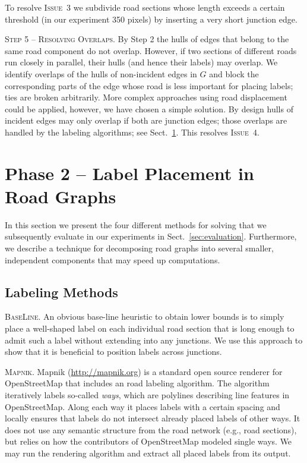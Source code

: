 \documentclass[a4paper,11pt]{article}
\newcommand{\myparagraph}[1]{\vspace*{.8ex}\noindent #1}
\newcommand{\ILong}{\textsc{Issue~3}\xspace}
\newcommand{\IFatLabels}{\textsc{Issue~4}\xspace}
\newcommand{\GreedyAlgo}{\textsc{Base\-Line}\xspace}
\begin{document}
 
 
 
To resolve \ILong we
 subdivide road sections whose length exceeds a certain threshold (in
 our experiment 350 pixels) by inserting a very short junction edge.


\textsc{Step 5 -- Resolving Overlaps.} By Step 2 the
hulls of edges that belong to the same road component
do not overlap. However, if two sections of different roads run
closely in parallel, their hulls (and hence their labels) may overlap. We identify overlaps of
the hulls of non-incident edges in $G$ and block the corresponding
parts of the edge whose road is less
important for placing labels; ties are broken arbitrarily. More complex approaches
using road displacement could be applied, however, we have chosen a simple solution.  By design hulls
of incident edges may only overlap if both are junction edges; those
overlaps are handled by the labeling algorithms; see
Sect.~\ref{sec:labeling}.  This resolves \IFatLabels.








\section{Phase 2 -- Label Placement in Road
  Graphs}\label{sec:labeling} 
  
  In this section we present the four different methods for solving \MaxTotalCovering that we subsequently evaluate in our experiments in Sect.~\ref{sec:evaluation}. Furthermore, we describe a technique for decomposing road graphs into several smaller, independent components that may speed up computations.


\subsection{Labeling Methods}


\myparagraph{\GreedyAlgo.} An obvious base-line heuristic to obtain lower bounds is to simply place a well-shaped label on each individual road section that is long enough to admit such a label without extending into any junctions. We use this approach to show that it is beneficial to position labels across junctions.
 
\myparagraph{\textsc{Mapnik}.} Mapnik (\url{http://mapnik.org}) is a standard
open source renderer for OpenStreetMap that includes an road labeling algorithm.
The algorithm iteratively labels so-called \emph{ways}, which are
polylines describing line features in OpenStreetMap. Along each way it
places labels with a certain spacing and locally ensures that labels
do not intersect already placed labels of other ways.  It does not use any semantic structure from the road network (e.g., road sections), but
relies on how the contributors of OpenStreetMap modeled single ways. We may run the rendering algorithm and extract all placed labels from its output. 
\end{document}
